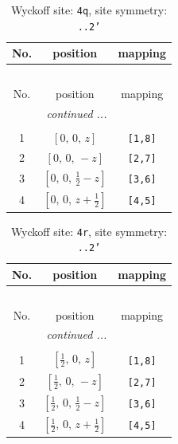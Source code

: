 \documentclass[fleqn,8pt]{jsarticle}
\begin{document}
\renewcommand{\arraystretch}{1.2}
\begin{longtable}{ccc}
\caption{Wyckoff site: {\tt 4q}, site symmetry: {\tt ..2'}}
 \\
 \hline \hline
No. & position & mapping \\ \hline \endfirsthead

\multicolumn{2}{l}{\tablename\ \thetable{}} \\
 \hline \hline
No. & position & mapping \\ \hline \endhead

 \hline \hline
\multicolumn{2}{r}{\footnotesize\it continued ...} \\ \endfoot

 \hline \hline
\multicolumn{2}{r}{} \\ \endlastfoot

1 & $\left[ 0,\, 0,\, z \right]$ & {\tt [1,8]} \\ \hline
2 & $\left[ 0,\, 0,\, - z \right]$ & {\tt [2,7]} \\ \hline
3 & $\left[ 0,\, 0,\, \frac{1}{2} - z \right]$ & {\tt [3,6]} \\ \hline
4 & $\left[ 0,\, 0,\, z + \frac{1}{2} \right]$ & {\tt [4,5]} \\
\end{longtable}
\renewcommand{\arraystretch}{1.2}
\begin{longtable}{ccc}
\caption{Wyckoff site: {\tt 4r}, site symmetry: {\tt ..2'}}
 \\
 \hline \hline
No. & position & mapping \\ \hline \endfirsthead

\multicolumn{2}{l}{\tablename\ \thetable{}} \\
 \hline \hline
No. & position & mapping \\ \hline \endhead

 \hline \hline
\multicolumn{2}{r}{\footnotesize\it continued ...} \\ \endfoot

 \hline \hline
\multicolumn{2}{r}{} \\ \endlastfoot

1 & $\left[ \frac{1}{2},\, 0,\, z \right]$ & {\tt [1,8]} \\ \hline
2 & $\left[ \frac{1}{2},\, 0,\, - z \right]$ & {\tt [2,7]} \\ \hline
3 & $\left[ \frac{1}{2},\, 0,\, \frac{1}{2} - z \right]$ & {\tt [3,6]} \\ \hline
4 & $\left[ \frac{1}{2},\, 0,\, z + \frac{1}{2} \right]$ & {\tt [4,5]} \\
\end{longtable}
\end{document}
